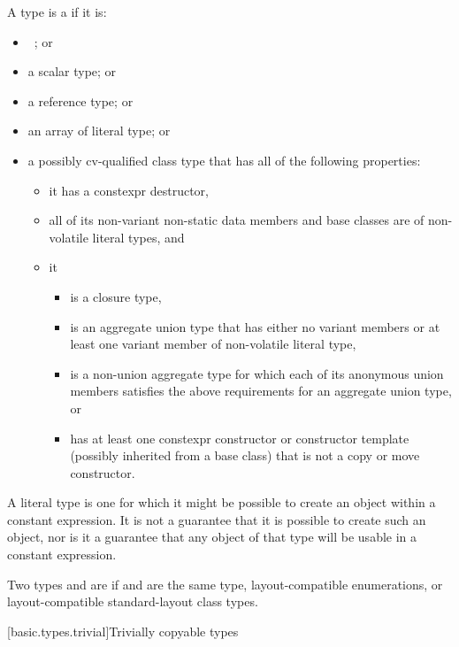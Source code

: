 \pnum
\label{term.literal.type}%
A type is a  if it is:
\begin{itemize}
\item \cv{}~; or
\item a scalar type; or
\item a reference type; or
\item an array of literal type; or
\item a possibly cv-qualified class type that
has all of the following properties:
\begin{itemize}
\item it has a constexpr destructor,
\item all of its non-variant non-static data members and base classes are of non-volatile literal types, and
\item it
\begin{itemize}
\item is a closure type,
\item is an aggregate union type that has either
no variant members or
at least one variant member of non-volatile literal type,
\item is a non-union aggregate type for which
each of its anonymous union members
satisfies the above requirements for an aggregate union type, or
\item has at least one constexpr constructor or constructor template
(possibly inherited from a base class)
that is not a copy or move constructor.
\end{itemize}
\end{itemize}
\end{itemize}
\begin{note}
A literal type is one for which
it might be possible to create an object
within a constant expression.
It is not a guarantee that it is possible to create such an object,
nor is it a guarantee that any object of that type
will be usable in a constant expression.
\end{note}

\pnum
\label{term.layout.compatible.type}%
Two types   and   are
if  and  are the same type,
layout-compatible enumerations, or
layout-compatible standard-layout class types.

[basic.types.trivial]{Trivially copyable types}

